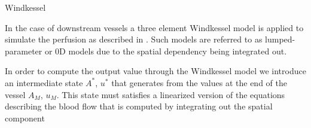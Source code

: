 \documentclass[a4paper, oneside]{discothesis}
\begin{document}
Windkessel

In the case of downstream vessels a three element Windkessel model is applied to simulate the perfusion as described in \cite{CiCP-4-317}.
Such models are referred to as lumped-parameter or 0D models due to the spatial dependency being integrated out.
\begin{comment}
	At capillary level, the pressure is assumed to be zero, i.e. $P_{\text {out }}=0$ and the coupling is performed by assuming that an intermediate state $\left(A^*, u^*\right)$ generates from $\left(A_l, u_l\right)$
	45
	D outlet) and $\left(A_r, u_r\right)$ (0D inlet) (Alastruey et al., 2008).
\end{comment}
In order to compute the output value through the Windkessel model we introduce an intermediate state $A^*$, $u^*$ that generates from the values at the end of the vessel $A_M$, $u_M$.
This state must satisfies a linearized version of the equations describing the blood flow that is computed by integrating out the spatial component
\begin{comment}
	\begin{equation}
		A^* u^*\left(1+\frac{R_1}{R_2}\right)+C_c R_1 \frac{\partial\left(A^* u^*\right)}{\partial t}=\frac{P_e-P_{\text {out }}}{R_2}+C_c \frac{\partial P_e}{\partial t}, \label{wk_eq1}
	\end{equation}
	where $P_c$ is initialised to zero and, at each time step, computed as
	\begin{equation}
		C_c \frac{\partial P_c}{\partial t}=A^* u^*-\frac{P_c-P_{\text {out }}}{R_2}. \label{wk_eq2}
	\end{equation}
	We consider $\beta$ and $A_0$ to be the same on both sides of the $0 \mathrm{D} / 1 \mathrm{D}$ interface. This yields the non-linear equation
	\begin{equation}
		f\left(A^*\right)=A^* R_1\left(u_l+4 c_l\right)-4 A^* R_1 c^*-\frac{\beta}{A_0}\left(\sqrt{A^*}-\sqrt{A_0}\right)+P_c \label{wk_eq3}
	\end{equation}
	where $c_l$ and $c^*$ are the wave speeds calculated with $A_l$ and $A^*$ respectively. $A^*$ is inilised to $A_l$ and $f\left(A^*\right)=0$ is solved iteratively by means of Newton's method. Once $A^*$ is found, $u^*$ reads
	\begin{equation}
		u^*=\frac{P_e^*-P_{o u t}}{A^* R_1}
	\end{equation}
	where $P_e^*=P_e\left(A^*\right)$.
	The corresponding code can be found in 

	src/boundary\_conditions.jl:169-216.
\end{comment}
\end{document}
